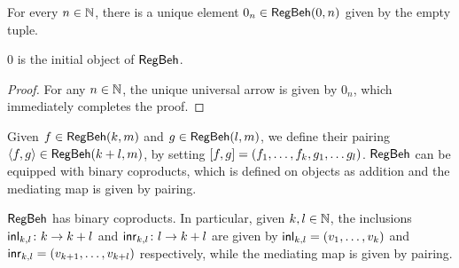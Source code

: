  For every $n \in \mathbb{N}$, there is a unique element $0_n \in \mathsf{RegBeh}(0,n)$ given by the empty tuple.
 \begin{lemma}
	$0$ is the initial object of $\mathsf{RegBeh}$.
\end{lemma}
\begin{proof}
	For any $n \in \mathbb{N}$, the unique universal arrow is given by $0_n$, which immediately completes the proof.
\end{proof}
 Given $f \in \mathsf{RegBeh}(k,m)$ and $g \in \mathsf{RegBeh}(l,m)$, we define their pairing $\langle f , g \rangle \in \mathsf{RegBeh} (k + l,m)$, by setting $\left[ f , g \right] = (f_1, \dots, f_k, g_1, \dots g_l)$. $\mathsf{RegBeh}$ can be equipped with binary coproducts, which is defined on objects as addition and the mediating map is given by pairing.
\begin{lemma}
	$\mathsf{RegBeh}$ has binary coproducts. In particular, given $k, l \in \mathbb{N}$, the inclusions $\mathsf{inl}_{k,l} \colon k \to k +l$ and $\mathsf{inr}_{k,l} \colon l \to k + l$ are given by $\mathsf{inl}_{k,l} = (v_1, \dots, v_k)$ and $\mathsf{inr}_{k,l} = (v_{k+1}, \dots, v_{k+l})$ respectively, while the mediating map is given by pairing. 
\end{lemma}
